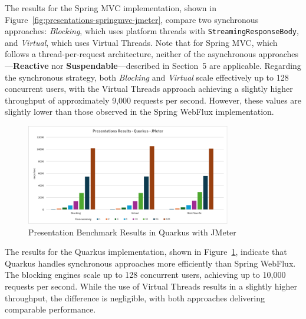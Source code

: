 
The results for the Spring MVC implementation, shown in
Figure~\ref{fig:presentations-springmvc-jmeter}, compare two synchronous
approaches: \textit{Blocking}, which uses platform threads with
\texttt{StreamingResponseBody}, and \textit{Virtual}, which uses Virtual
Threads. Note that for Spring MVC, which follows a thread-per-request
architecture, neither of the asynchronous approaches—\textbf{Reactive} nor
\textbf{Suspendable}—described in Section~5 are applicable. Regarding the
synchronous strategy, both \textit{Blocking} and \textit{Virtual} scale
effectively up to 128 concurrent users, with the Virtual Threads approach
achieving a slightly higher throughput of approximately 9,000 requests per
second. However, these values are slightly lower than those observed in the
Spring WebFlux implementation.

\begin{figure}[h]
     \centering
     \includegraphics[width=0.8\textwidth]{./Graphs/presentations-quarkus-jmeter.png}
     \caption{Presentation Benchmark Results in Quarkus with JMeter}\label{fig:presentations-quarkus-jmeter}
\end{figure}

The results for the Quarkus implementation, shown in
Figure~\ref{fig:presentations-quarkus-jmeter}, indicate that Quarkus handles
synchronous approaches more efficiently than Spring WebFlux. The blocking
engines scale up to 128 concurrent users, achieving up to 10,000 requests per
second. While the use of Virtual Threads results in a slightly higher
throughput, the difference is negligible, with both approaches delivering
comparable performance.

